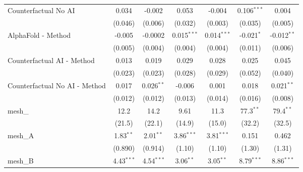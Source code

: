 \begin{tabular}{lcccccc}
   Counterfactual No AI                                        & 0.034          & -0.002         & 0.053         & -0.004        & 0.106$^{***}$ & 0.004\\   
                                                               & (0.046)        & (0.006)        & (0.032)       & (0.003)       & (0.035)       & (0.005)\\   
   AlphaFold - Method                                          & -0.005         & -0.0002        & 0.015$^{***}$ & 0.014$^{***}$ & -0.021$^{*}$  & -0.012$^{**}$\\   
                                                               & (0.005)        & (0.004)        & (0.004)       & (0.004)       & (0.011)       & (0.006)\\   
   Counterfactual AI - Method                                  & 0.013          & 0.019          & 0.029         & 0.028         & 0.025         & 0.045\\   
                                                               & (0.023)        & (0.023)        & (0.028)       & (0.029)       & (0.052)       & (0.040)\\   
   Counterfactual No AI - Method                               & 0.017          & 0.026$^{**}$   & -0.006        & 0.001         & 0.018         & 0.021$^{**}$\\   
                                                               & (0.012)        & (0.012)        & (0.013)       & (0.014)       & (0.016)       & (0.008)\\   
   mesh\_                                                      & 12.2           & 14.2           & 9.61          & 11.3          & 77.3$^{**}$   & 79.4$^{**}$\\   
                                                               & (21.5)         & (22.1)         & (14.9)        & (15.0)        & (32.2)        & (32.5)\\   
   mesh\_A                                                     & 1.83$^{**}$    & 2.01$^{**}$    & 3.86$^{***}$  & 3.81$^{***}$  & 0.151         & 0.462\\   
                                                               & (0.890)        & (0.914)        & (1.10)        & (1.10)        & (1.30)        & (1.31)\\   
   mesh\_B                                                     & 4.43$^{***}$   & 4.54$^{***}$   & 3.06$^{**}$   & 3.05$^{**}$   & 8.79$^{***}$  & 8.86$^{***}$\\   

\end{tabular}
